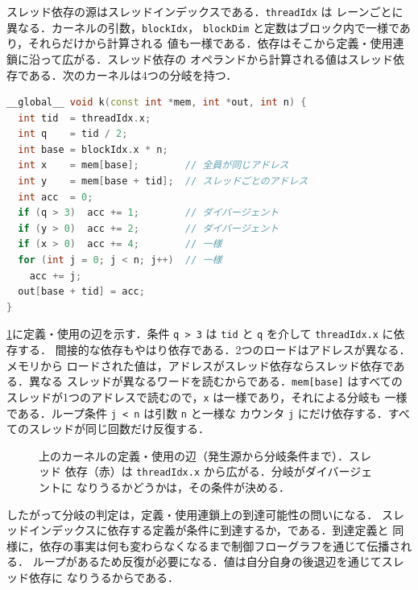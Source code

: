 \documentclass[../main.tex]{subfiles}
\begin{document}
スレッド依存の源はスレッドインデックスである．\texttt{threadIdx} は
レーンごとに異なる．カーネルの引数，\texttt{blockIdx}，
\texttt{blockDim} と定数はブロック内で一様であり，それらだけから計算される
値も一様である．依存はそこから定義・使用連鎖に沿って広がる．スレッド依存の
オペランドから計算される値はスレッド依存である．次のカーネルは4つの分岐を持つ．

\begin{lstlisting}[language=C++, numbers=none]
__global__ void k(const int *mem, int *out, int n) {
  int tid  = threadIdx.x;
  int q    = tid / 2;
  int base = blockIdx.x * n;
  int x    = mem[base];        // 全員が同じアドレス
  int y    = mem[base + tid];  // スレッドごとのアドレス
  int acc  = 0;
  if (q > 3)  acc += 1;        // ダイバージェント
  if (y > 0)  acc += 2;        // ダイバージェント
  if (x > 0)  acc += 4;        // 一様
  for (int j = 0; j < n; j++)  // 一様
    acc += j;
  out[base + tid] = acc;
}
\end{lstlisting}

\cref{fig:l11-divergence}に定義・使用の辺を示す．条件 \texttt{q > 3} は
\texttt{tid} と \texttt{q} を介して \texttt{threadIdx.x} に依存する．
間接的な依存もやはり依存である．2つのロードはアドレスが異なる．メモリから
ロードされた値は，アドレスがスレッド依存ならスレッド依存である．異なる
スレッドが異なるワードを読むからである．\texttt{mem[base]} はすべての
スレッドが1つのアドレスで読むので，\texttt{x} は一様であり，それによる分岐も
一様である．ループ条件 \texttt{j < n} は引数 \texttt{n} と一様な
カウンタ \texttt{j} にだけ依存する．すべてのスレッドが同じ回数だけ反復する．

\begin{figure}[tb]
  \centering
  
  \caption{上のカーネルの定義・使用の辺（発生源から分岐条件まで）．スレッド
    依存（赤）は \texttt{threadIdx.x} から広がる．分岐がダイバージェントに
    なりうるかどうかは，その条件が決める．}
  \label{fig:l11-divergence}
\end{figure}

したがって分岐の判定は，定義・使用連鎖上の到達可能性の問いになる．
スレッドインデックスに依存する定義が条件に到達するか，である．到達定義と
同様に，依存の事実は何も変わらなくなるまで制御フローグラフを通じて伝播される．
ループがあるため反復が必要になる．値は自分自身の後退辺を通じてスレッド依存に
なりうるからである．
\end{document}
